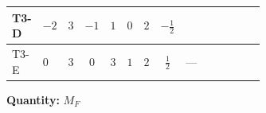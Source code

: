 \documentclass[8pt]{article}
\begin{document}
\begin{landscape}
\begin{longtable}{@{}llcccccc >{\raggedright\arraybackslash}p{0.21\linewidth} >{\raggedright\arraybackslash}p{0.21\linewidth} >{\raggedright\arraybackslash}p{0.21\linewidth}@{}}
\midrule
T3-D & $-2$ & $3$ & $-1$ & $1$ & $0$ & $2$ & $-\frac{1}{2}$ & \scriptsize\adjustbox{max width=\linewidth}{$\begin{gathered} \frac{1}{4} (3 \left(\left({y_1}\right)^{T}\,\left({y_1}\right)^{*}\,{M_F}\right)_{ij}+2 \left({M_F}\,\left({y_2}\right)^{\dagger}\,{y_2}\right)_{ij})\end{gathered}$} & \scriptsize\adjustbox{max width=\linewidth}{$\begin{gathered} -\frac{9}{2} {g_2}^2 \left({M_F}\right)_{ij}\end{gathered}$} & \scriptsize\adjustbox{max width=\linewidth}{$\begin{gathered} -\frac{3}{2} {g_1}^2 \left({M_F}\right)_{ij}\end{gathered}$} \\
\midrule
T3-E & $0$ & $3$ & $0$ & $3$ & $1$ & $2$ & $\frac{1}{2}$ & --- & \scriptsize\adjustbox{max width=\linewidth}{$\begin{gathered} -\frac{9}{2} {g_2}^2 \left({M_F}\right)_{ij}\end{gathered}$} & \scriptsize\adjustbox{max width=\linewidth}{$\begin{gathered} -\frac{3}{2} {g_1}^2 \left({M_F}\right)_{ij}\end{gathered}$} \\
\midrule
\bottomrule
\end{longtable}
\clearpage
\noindent\textbf{Quantity: }$M_F$\par\smallskip

\end{landscape}
\end{document}
